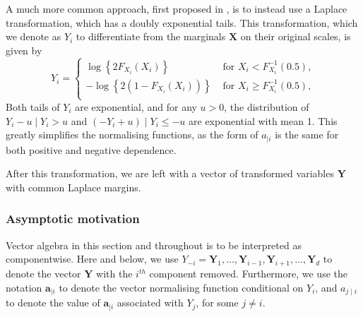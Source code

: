 \documentclass{article}
\numberwithin{equation}{section}
\begin{document}
A much more common approach, first proposed in \citet{Keef2013}, is to instead use a Laplace transformation, which has a doubly exponential tails.
This transformation, which we denote as $Y_i$ to differentiate from the marginals $\bm{X}$ on their original scales, is given by 
\begin{equation} \label{eq:laplace}
  Y_i = \begin{cases}
    \log\left\{2F_{X_i}(X_i)\right\} &\text{ for } X_i < F_{X_i}^{-1}(0.5), \\
    -\log\left\{2(1 - F_{X_i}(X_i))\right\} &\text{ for } X_i \ge F_{X_i}^{-1}(0.5), \\
  \end{cases}
\end{equation}
Both tails of $Y_i$ are exponential, and for any $u > 0$, the distribution of $Y_i - u \mid Y_i > u$ and $(-Y_i + u) \mid Y_i \le -u$ are exponential with mean 1. 
This greatly simplifies the normalising functions, as the form of $a_{\mid i}$ is the same for both positive and negative dependence. 

After this transformation, we are left with a vector of transformed variables $\bm{Y}$ with common Laplace margins. 

\subsubsection{Asymptotic motivation}

Vector algebra in this section and throughout is to be interpreted as componentwise.
Here and below, we use $Y_{-i} = {\bm{Y}_1, \ldots, \bm{Y}_{i-1}, \bm{Y}_{i+1}, \ldots, \bm{Y}_d}$ to denote the vector $\bm{Y}$ with the $i^{th}$ component removed. 
Furthermore, we use the notation $\bm{a}_{\mid i}$ to denote the vector normalising function conditional on $Y_i$, and $a_{j \mid i}$ to denote the value of $\bm{a}_{\mid i}$ associated with $Y_j$, for some $j \ne i$. 
\end{document}
